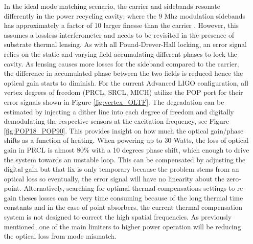 	In the ideal mode matching scenario, the carrier and sidebands resonate differently in the power recycling cavity; where the 9 Mhz modulation sidebands has approximately a factor of 10 larger finesse than the carrier \cite{kiwamu_freq1}.  However, this assumes a lossless interferometer and needs to be revisited in the presence of substrate thermal lensing.   As with all Pound-Drever-Hall locking, an error signal relies on the static and varying field accumulating different phases to lock the cavity. As lensing causes more losses for the sideband compared to the carrier, the difference in accumulated phase between the two fields is reduced hence the optical gain starts to diminish.  For the current Advanced LIGO configuration, all vertex degrees of freedom (PRCL, SRCL, MICH) utilize the POP port for their error signals shown in Figure \ref{fig:vertex_OLTF}. The degradation can be estimated by injecting a dither line into each degree of freedom and digitally demodulating the respective sensors at the excitation frequency, see Figure \ref{fig:POP18_POP90}.  This provides insight on how much the optical gain/phase shifts as a function of heating.  When powering up to 30 Watts, the loss of optical gain in PRCL is almost 80\% with a 10 degrees phase shift, which enough to drive the system towards an unstable loop.  This can be compensated by adjusting the digital gain but that fix is only temporary because the problem stems from an optical loss so eventually, the error signal will have no linearity about the zero-point.  Alternatively, searching for optimal thermal compensations settings to re-gain theses losses can be very time consuming because of the long thermal time constants and in the case of point absorbers, the current thermal compensation system is not designed to correct the high spatial frequencies.  As previously mentioned, one of the main limiters to higher power operation will be reducing the optical loss from mode mismatch.

